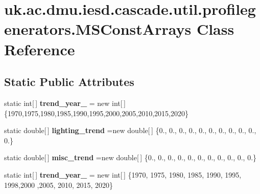 \hypertarget{classuk_1_1ac_1_1dmu_1_1iesd_1_1cascade_1_1util_1_1profilegenerators_1_1_m_s_const_arrays}{\section{uk.\-ac.\-dmu.\-iesd.\-cascade.\-util.\-profilegenerators.\-M\-S\-Const\-Arrays Class Reference}
\label{classuk_1_1ac_1_1dmu_1_1iesd_1_1cascade_1_1util_1_1profilegenerators_1_1_m_s_const_arrays}
}
\subsection*{Static Public Attributes}
\begin{DoxyCompactItemize}
\item 
\hypertarget{classuk_1_1ac_1_1dmu_1_1iesd_1_1cascade_1_1util_1_1profilegenerators_1_1_m_s_const_arrays_ac526af404a89880de21a81c787752ec3}{static int\mbox{[}$\,$\mbox{]} {\bfseries trend\-\_\-year\-\_} = new int\mbox{[}$\,$\mbox{]}\{1970,1975,1980,1985,1990,1995,2000,2005,2010,2015,2020\}}\label{classuk_1_1ac_1_1dmu_1_1iesd_1_1cascade_1_1util_1_1profilegenerators_1_1_m_s_const_arrays_ac526af404a89880de21a81c787752ec3}

\item 
\hypertarget{classuk_1_1ac_1_1dmu_1_1iesd_1_1cascade_1_1util_1_1profilegenerators_1_1_m_s_const_arrays_a76547ce26ec9919f077ddedae470d13e}{static double\mbox{[}$\,$\mbox{]} {\bfseries lighting\-\_\-trend} =new double\mbox{[}$\,$\mbox{]} \{0., 0., 0., 0., 0., 0., 0., 0., 0., 0., 0.\}}\label{classuk_1_1ac_1_1dmu_1_1iesd_1_1cascade_1_1util_1_1profilegenerators_1_1_m_s_const_arrays_a76547ce26ec9919f077ddedae470d13e}

\item 
\hypertarget{classuk_1_1ac_1_1dmu_1_1iesd_1_1cascade_1_1util_1_1profilegenerators_1_1_m_s_const_arrays_a85b2997d51ca896368f0c94988461435}{static double\mbox{[}$\,$\mbox{]} {\bfseries misc\-\_\-trend} =new double\mbox{[}$\,$\mbox{]} \{0., 0., 0., 0., 0., 0., 0., 0., 0., 0., 0.\}}\label{classuk_1_1ac_1_1dmu_1_1iesd_1_1cascade_1_1util_1_1profilegenerators_1_1_m_s_const_arrays_a85b2997d51ca896368f0c94988461435}

\item 
\hypertarget{classuk_1_1ac_1_1dmu_1_1iesd_1_1cascade_1_1util_1_1profilegenerators_1_1_m_s_const_arrays_a0861ea6a7c706b12389d4e032ba04e26}{static int\mbox{[}$\,$\mbox{]} {\bfseries trend\-\_\-year\-\_} = new int\mbox{[}$\,$\mbox{]} \{1970, 1975, 1980, 1985, 1990, 1995, 1998,2000 ,2005, 2010, 2015, 2020\}}\label{classuk_1_1ac_1_1dmu_1_1iesd_1_1cascade_1_1util_1_1profilegenerators_1_1_m_s_const_arrays_a0861ea6a7c706b12389d4e032ba04e26}


\end{DoxyCompactItemize}
